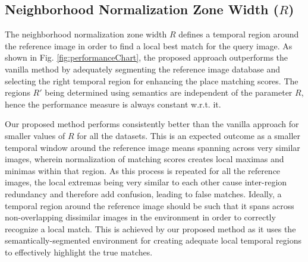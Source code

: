 \documentclass[letterpaper, 10 pt, conference]{ieeeconf}  %
\begin{document}


\subsection{Neighborhood Normalization Zone Width ($R$)}
The neighborhood normalization zone width $R$ defines a temporal region around the reference image in order to find a local best match for the query image. As shown in Fig. \ref{fig:performanceChart}, the proposed approach outperforms the vanilla method by adequately segmenting the reference image database and selecting the right temporal region for enhancing the place matching scores. The regions $R'$ being determined using semantics are independent of the parameter $R$, hence the performance measure is always constant w.r.t. it.

Our proposed method performs consistently better than the vanilla approach for smaller values of $R$ for all the datasets. This is an expected outcome as a smaller temporal window around the reference image means spanning across very similar images, wherein normalization of matching scores creates local maximas and minimas within that region. As this process is repeated for all the reference images, the local extremas being very similar to each other cause inter-region redundancy and therefore add confusion, leading to false matches. Ideally, a temporal region around the reference image should be such that it spans across non-overlapping dissimilar images in the environment in order to correctly recognize a local match. This is achieved by our proposed method as it uses the semantically-segmented environment for creating adequate local temporal regions to effectively highlight the true matches.
\end{document}
